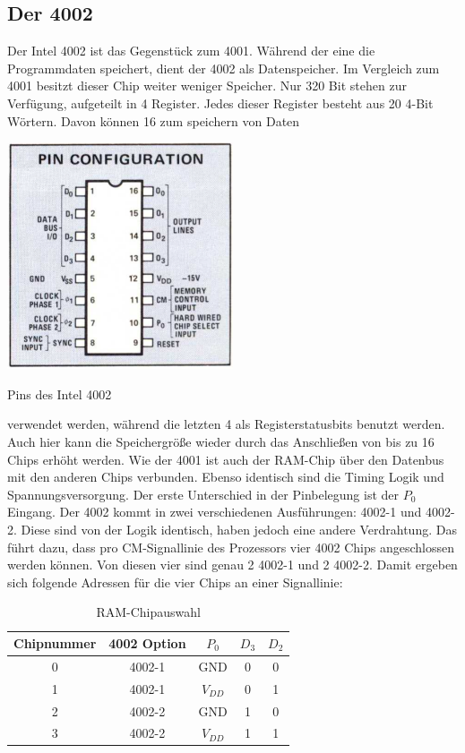 \subsection{Der 4002}
Der Intel 4002 ist das Gegenstück zum 4001. Während der eine die Programmdaten speichert, dient der 4002 als Datenspeicher. Im Vergleich zum 4001 besitzt dieser Chip weiter weniger Speicher. Nur 320 Bit stehen zur Verfügung, aufgeteilt in 4 Register. Jedes dieser Register besteht aus 20 4-Bit Wörtern. Davon können 16 zum speichern von Daten
\vspace{-23pt}
 \begin{floatingfigure}[r]{.5\textwidth}
 	\vspace{-10pt}
 	\includegraphics[width=0.5\textwidth]{figures/pins_4002.png}
 	\caption{Pins des Intel 4002}
 	\label{fig:pins_4002}
 \end{floatingfigure}
verwendet werden, während die letzten 4 als Registerstatusbits benutzt werden. Auch hier kann die Speichergröße wieder durch das Anschließen von bis zu 16 Chips erhöht werden. Wie der 4001 ist auch der RAM-Chip über den Datenbus mit den anderen Chips verbunden. Ebenso identisch sind die Timing Logik und Spannungsversorgung. Der erste Unterschied in der Pinbelegung ist der $P_0$ Eingang. Der 4002 kommt in zwei verschiedenen Ausführungen: 4002-1 und 4002-2. Diese sind von der Logik identisch, haben jedoch eine andere Verdrahtung. Das führt dazu, dass pro CM-Signallinie des Prozessors vier 4002 Chips angeschlossen werden können. Von diesen vier sind genau 2 4002-1 und 2 4002-2.
Damit ergeben sich folgende Adressen für die vier Chips an einer Signallinie:
\begin{table}[H]
	\centering
	\begin{tabular}{c | c | c | c  c}
		Chipnummer & 4002 Option & $P_0$ & $D_3$ & $D_2$ \\
		\hline
		0 	& 4002-1 & GND & 0 & 0 \\
		1	& 4002-1 & $V_{DD}$ & 0 & 1 \\
		2	& 4002-2 & GND & 1 & 0 \\
		3	& 4002-2 & $V_{DD}$ & 1 & 1	
	\end{tabular}
	\caption{RAM-Chipauswahl}
	\label{ramauswahl}
\end{table}


